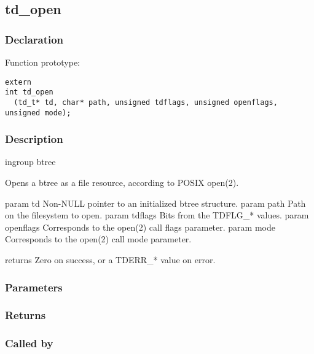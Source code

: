 
\newpage
\subsection{td\_open}
\subsubsection{Declaration} Function prototype:

\begin{verbatim}
extern
int td_open
  (td_t* td, char* path, unsigned tdflags, unsigned openflags, unsigned mode);
\end{verbatim}

\subsubsection{Description}

 
 ingroup btree

 Opens a btree as a file resource, according to POSIX open(2).

 param td Non-NULL pointer to an initialized btree structure.
 param path Path on the filesystem to open.
 param tdflags Bits from the TDFLG\_* values.
 param openflags Corresponds to the open(2) call flags parameter.
 param mode Corresponds to the open(2) call mode parameter.

 returns Zero on success, or a TDERR\_* value on error.
 

\subsubsection{Parameters}
\subsubsection{Returns}
\subsubsection{Called by}

